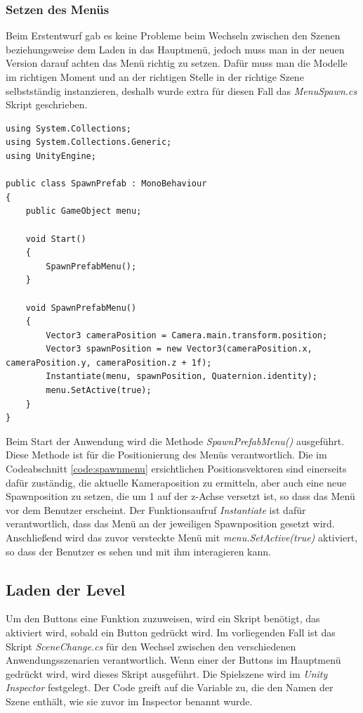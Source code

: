 \subsubsection{Setzen des Menüs}
Beim Erstentwurf gab es keine Probleme beim Wechseln zwischen den Szenen beziehungsweise dem Laden in das Hauptmenü, jedoch muss man in der neuen Version darauf achten das Menü richtig zu setzen. Dafür muss man die Modelle im richtigen Moment und an der richtigen Stelle in der richtige Szene selbstständig instanzieren, deshalb wurde extra für diesen Fall das \textit{MenuSpawn.cs} Skript geschrieben.

\begin{lstlisting}[style=csharp, caption=Menueinstanzierung bei Neuladen., label=code:spawnmenu]
using System.Collections;
using System.Collections.Generic;
using UnityEngine;

public class SpawnPrefab : MonoBehaviour
{
    public GameObject menu;

    void Start()
    {
        SpawnPrefabMenu();
    }

    void SpawnPrefabMenu()
    {
        Vector3 cameraPosition = Camera.main.transform.position;
        Vector3 spawnPosition = new Vector3(cameraPosition.x, cameraPosition.y, cameraPosition.z + 1f);
        Instantiate(menu, spawnPosition, Quaternion.identity);
        menu.SetActive(true);
    }
}
\end{lstlisting}

Beim Start der Anwendung wird die Methode \textit{SpawnPrefabMenu()} ausgeführt. Diese Methode ist für die Positionierung des Menüs verantwortlich. Die im Codeabschnitt \ref{code:spawnmenu} ersichtlichen Positionsvektoren sind einerseits dafür zuständig, die aktuelle Kameraposition zu ermitteln, aber auch eine neue Spawnposition zu setzen, die um 1 auf der z-Achse versetzt ist, so dass das Menü vor dem Benutzer erscheint. Der Funktionsaufruf \textit{Instantiate} ist dafür verantwortlich, dass das Menü an der jeweiligen Spawnposition gesetzt wird. Anschließend wird das zuvor versteckte Menü mit \textit{menu.SetActive(true)} aktiviert, so dass der Benutzer es sehen und mit ihm interagieren kann.

\subsection{Laden der Level}
Um den Buttons eine Funktion zuzuweisen, wird ein Skript benötigt, das aktiviert wird, sobald ein Button gedrückt wird.
Im vorliegenden Fall ist das Skript \textit{SceneChange.cs} für den Wechsel zwischen den verschiedenen Anwendungsszenarien verantwortlich.
Wenn einer der Buttons im Hauptmenü gedrückt wird, wird dieses Skript ausgeführt. Die Spielszene wird im \textit{Unity Inspector}
festgelegt. Der Code greift auf die Variable zu, die den Namen der Szene enthält, wie sie zuvor im Inspector benannt wurde.

